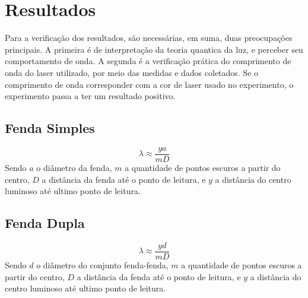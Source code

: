 \section{Resultados}\label{result}

Para a verificação dos resultados, são necessárias, em suma, duas preocupações principais. A primeira é de interpretação da teoria quantica da luz, e perceber seu comportamento de onda. A segunda é a verificação prática do comprimento de onda do laser utilizado, por meio das medidas e dados coletados. Se o comprimento de onda corresponder com a cor de laser usado no experimento, o experimento passa a ter um resultado positivo.

\subsection{Fenda Simples}\label{fenda_simples}
\begin{equation}
	\lambda \approx \frac{ya}{mD}
\end{equation}
Sendo $a$ o diâmetro da fenda, $m$ a quantidade de pontos escuros a partir do centro, $D$ a distância da fenda até o ponto de leitura, e $y$ a distância do centro luminoso até ultimo ponto de leitura.

\subsection{Fenda Dupla}\label{fenda_dupla}
\begin{equation}
	\lambda \approx \frac{yd}{mD}
\end{equation}
Sendo $d$ o diâmetro do conjunto fenda-fenda, $m$ a quantidade de pontos escuros a partir do centro, $D$ a distância da fenda até o ponto de leitura, e $y$ a distância do centro luminoso até ultimo ponto de leitura.
